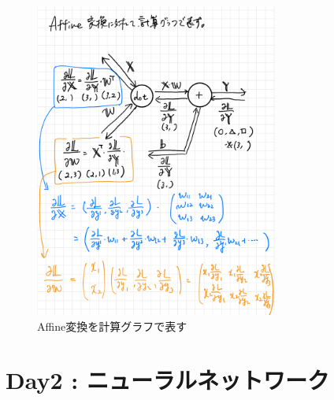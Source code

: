 \documentclass{ltjsarticle}
\begin{document}
\begin{figure}[htbp]
  \centering
  \includegraphics[width=8cm]{./capture/affine_calc_graph.png}
  \caption{Affine変換を計算グラフで表す}
  \label{fig:affine_calc_graph}
\end{figure}
  
\newpage

\section{Day2 : ニューラルネットワーク}
\end{document}
